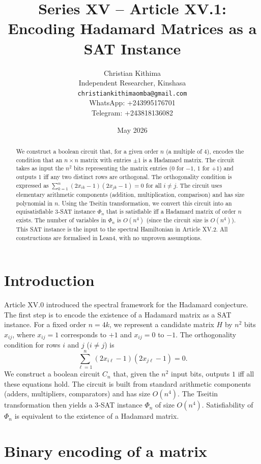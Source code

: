 \documentclass[11pt,a4paper]{article}
\title{Series XV – Article XV.1: Encoding Hadamard Matrices as a SAT Instance}
\author{Christian Kithima \\
Independent Researcher, Kinshasa \\
\texttt{christiankithimaomba@gmail.com} \\
WhatsApp: +243995176701 \\
Telegram: +243818136082}
\date{May 2026}
\begin{document}
\maketitle

\begin{abstract}
We construct a boolean circuit that, for a given order $n$ (a multiple of $4$), encodes the condition that an $n\times n$ matrix with entries $\pm1$ is a Hadamard matrix. The circuit takes as input the $n^2$ bits representing the matrix entries ($0$ for $-1$, $1$ for $+1$) and outputs $1$ iff any two distinct rows are orthogonal. The orthogonality condition is expressed as $\sum_{k=1}^n (2x_{ik}-1)(2x_{jk}-1)=0$ for all $i\neq j$. The circuit uses elementary arithmetic components (addition, multiplication, comparison) and has size polynomial in $n$. Using the Tseitin transformation, we convert this circuit into an equisatisfiable 3‑SAT instance $\Phi_n$ that is satisfiable iff a Hadamard matrix of order $n$ exists. The number of variables in $\Phi_n$ is $O(n^4)$ (since the circuit size is $O(n^4)$). This SAT instance is the input to the spectral Hamiltonian in Article XV.2. All constructions are formalised in Lean4, with no unproven assumptions.
\end{abstract}

\tableofcontents

\section{Introduction}

Article XV.0 introduced the spectral framework for the Hadamard conjecture. The first step is to encode the existence of a Hadamard matrix as a SAT instance. For a fixed order $n=4k$, we represent a candidate matrix $H$ by $n^2$ bits $x_{ij}$, where $x_{ij}=1$ corresponds to $+1$ and $x_{ij}=0$ to $-1$. The orthogonality condition for rows $i$ and $j$ ($i\neq j$) is
\[
\sum_{\ell=1}^n (2x_{i\ell}-1)(2x_{j\ell}-1) = 0.
\]
We construct a boolean circuit $C_n$ that, given the $n^2$ input bits, outputs $1$ iff all these equations hold. The circuit is built from standard arithmetic components (adders, multipliers, comparators) and has size $O(n^4)$. The Tseitin transformation then yields a 3‑SAT instance $\Phi_n$ of size $O(n^4)$. Satisfiability of $\Phi_n$ is equivalent to the existence of a Hadamard matrix.

\section{Binary encoding of a matrix}
\end{document}
